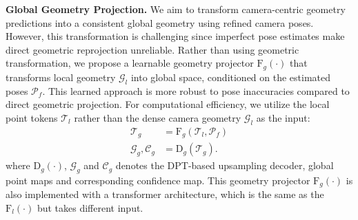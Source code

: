 
\noindent\textbf{Global Geometry Projection.}
We aim to transform camera-centric geometry predictions into a consistent global geometry using refined camera poses. However, this transformation is challenging since imperfect pose estimates make direct geometric reprojection unreliable.
%
Rather than using geometric transformation, we propose a learnable geometry projector $\mathrm{F}_g(\cdot)$ that transforms local geometry $\mathcal{G}_l$ into global space, conditioned on the estimated poses $\mathcal{P}_f$. This learned approach is more robust to pose inaccuracies compared to direct geometric projection.
%
For computational efficiency, we utilize the local point tokens $\mathcal{T}_l$ rather than the dense camera geometry $\mathcal{G}_l$ as the input:
\begin{align}
    \mathcal{T}_g &= \mathrm{F}_g(\mathcal{T}_l, \mathcal{P}_f) \\
    \mathcal{G}_{g}, \mathcal{C}_{g} &= \mathrm{D}_g(\mathcal{T}_{g}).
\end{align}
where $\mathrm{D}_g(\cdot)$, $\mathcal{G}_g$ and $\mathcal{C}_g$  denotes the DPT-based upsampling decoder, global point maps and corresponding confidence map.
%
This geometry projector $\mathrm{F}_g(\cdot)$ is also implemented with a transformer architecture, which is the same as the $\mathrm{F}_l(\cdot)$ but takes different input.



% 




